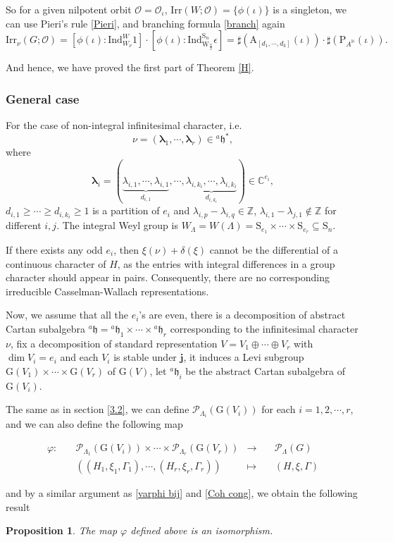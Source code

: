 \documentclass[12pt, a4paper]{amsart}
\numberwithin{equation}{section}
\newtheorem{prop}[thm]{Proposition}
\newcommand{\blam}{{\boldsymbol{\lambda}}}
\newcommand{\BC}{{\mathbb {C}}}
\newcommand{\BH}{{\mathbb {H}}}
\newcommand{\BZ}{{\mathbb {Z}}}
\newcommand{\CO}{{\mathcal {O}}}
\newcommand{\CP}{{\mathcal {P}}}
\newcommand{\fh}{\mathfrak{h}}
\newcommand{\G}{{\mathrm{G}}}
\newcommand{\A}{{\mathrm{A}}}
\newcommand{\Ind}{{\mathrm{Ind}}}
\newcommand{\Irr}{{\mathrm{Irr}}}
\newcommand{\defmap}[5]{
           \begin{equation*}
              \begin{aligned}
                   #1:\quad  & #2 &\longrightarrow &\quad #3 \\
                      \quad  & #4    &\longmapsto  &\quad #5
              \end{aligned}
           \end{equation*}
          }
\begin{document}
So for a given nilpotent orbit $\CO = \CO_{\iota}$, $\Irr(W;\CO) = \{\phi(\iota)\}$ is a singleton, we can use Pieri's rule \ref{Pieri}, and branching formula \ref{branch} again
\begin{equation}
    \Irr_{\nu}(G;\CO) = [\phi(\iota):\Ind_{W_\nu}^{W}1]\cdot[\phi(\iota): \Ind_{\mathrm{W}_{\frac{n}{2}}}^{\mathrm{S}_n}\epsilon] = \sharp(\A_{[d_1,\cdots,d_k]}(\iota))\cdot \sharp(\mathrm{P}_{A^\BH}(\iota)).
\end{equation}

And hence, we have proved the first part of Theorem \ref{H}.

\subsubsection{General case}
For the case of non-integral infinitesimal character, i.e. 
$$\nu = (\blam_1, \cdots, \blam_r) \in {^{a}\fh}^*,$$ 
where 
$$\blam_i = (\underbrace{\lambda_{i,1}, \cdots, \lambda_{i,1}}_{d_{i,1}},\cdots,\underbrace{\lambda_{i,k_i},\cdots,\lambda_{i,k_i}}_{d_{i,k_i}}) \in \BC^{e_i},$$ $d_{i,1} \geq \cdots \geq d_{i,k_i} \geq 1$ is a partition of $e_i$ and $\lambda_{i,p} - \lambda_{i,q} \in \BZ$, $\lambda_{i,1} - \lambda_{j,1} \notin \BZ$ for different $i,j$. The integral Weyl group is $W_{\Lambda} = W(\Lambda) = \mathrm{S}_{e_1} \times \cdots \times \mathrm{S}_{e_r} \subseteq \mathrm{S}_n$. 

If there exists any odd $e_i$, then $\xi(\nu) + \delta(\xi)$ cannot be the differential of a continuous character of $H$, as the entries with integral differences in a group character should appear in pairs. Consequently, there are no corresponding irreducible Casselman-Wallach representations. 

Now, we assume that all the $e_i$'s are even, there is a decomposition of abstract Cartan subalgebra $^{a}\fh = {^{a}\fh_1} \times \cdots \times {^{a}\fh_r}$ corresponding to the infinitesimal character $\nu$, fix a decomposition of standard representation $V = V_1 \oplus \cdots \oplus V_r$ with $\dim V_{i} = e_i$ and each $V_i$ is stable under $\mathbf{j}$, it induces a Levi subgroup $\G(V_1) \times \cdots \times \G(V_r)$ of $\G(V)$, let $^{a}\fh_i$ be the abstract Cartan subalgebra of $\G(V_i)$.

The same as in section \ref{3.2}, we can define $\CP_{\Lambda_i}(\G(V_i))$ for each $i = 1,2,\cdots,r$, and we can also define the following map
\defmap{\varphi}{\CP_{\Lambda_1}(\G(V_i))\times \cdots \times \CP_{\Lambda_r}(\G(V_r))}{\CP_{\Lambda}(G)}{((H_1,\xi_1,\Gamma_1), \cdots,(H_r,\xi_r,\Gamma_r))}{(H,\xi,\Gamma)}
and by a similar argument as \ref{varphi bij} and \ref{Coh cong}, we obtain the following result
\begin{prop}
    The map $\varphi$ defined above is an isomorphism.
\end{prop}
\end{document}
